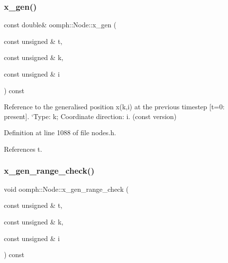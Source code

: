 \mbox{\label{classoomph_1_1Node_ad275a7551f9f4368584b1542ac9e210c}} 
\subsubsection{\texorpdfstring{x\+\_\+gen()}{x\_gen()}\hspace{0.1cm}{\footnotesize\ttfamily [4/4]}}
{\footnotesize\ttfamily const double\& oomph\+::\+Node\+::x\+\_\+gen (\begin{DoxyParamCaption}\item[{const unsigned \&}]{t,  }\item[{const unsigned \&}]{k,  }\item[{const unsigned \&}]{i }\end{DoxyParamCaption}) const\hspace{0.3cm}{\ttfamily [inline]}}



Reference to the generalised position x(k,i) at the previous timestep \mbox{[}t=0\+: present\mbox{]}. `\+Type\textquotesingle{}\+: k; Coordinate direction\+: i. (const version) 



Definition at line 1088 of file nodes.\+h.



References t.

\mbox{\label{classoomph_1_1Node_a58e9d5a62ae31a6512bfa7ef897cf3c6}} 
\subsubsection{\texorpdfstring{x\+\_\+gen\+\_\+range\+\_\+check()}{x\_gen\_range\_check()}}
{\footnotesize\ttfamily void oomph\+::\+Node\+::x\+\_\+gen\+\_\+range\+\_\+check (\begin{DoxyParamCaption}\item[{const unsigned \&}]{t,  }\item[{const unsigned \&}]{k,  }\item[{const unsigned \&}]{i }\end{DoxyParamCaption}) const\hspace{0.3cm}{\ttfamily [protected]}}



